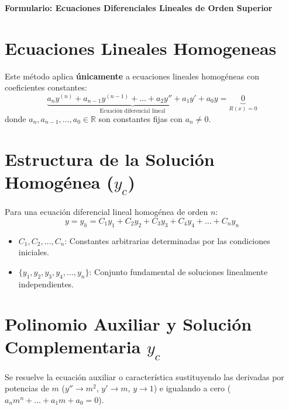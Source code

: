 \documentclass[10pt,letterpaper]{article}
\begin{document}
		
	\begin{center}
		{\Large \textbf{Formulario: Ecuaciones Diferenciales Lineales de Orden Superior}}
	\end{center}
	
	\vspace{0.3cm}
	
	\section*{Ecuaciones Lineales Homogeneas}
	Este método aplica \textbf{únicamente} a ecuaciones lineales homogéneas con coeficientes constantes:
	\[
	\underbrace{a_n y^{(n)} + a_{n-1} y^{(n-1)} + \dots + a_2 y'' + a_1 y' + a_0 y}_{\text{Ecuación diferencial lineal}} = \underbrace{0}_{R(x) = 0}
	\]
	donde $a_n, a_{n-1}, \dots, a_0 \in \mathbb{R}$ son constantes fijas con $a_n \neq 0$.
	
	
	
	\section*{Estructura de la Solución Homogénea ($y_c$)}
	Para una ecuación diferencial lineal homogénea de orden $n$:
	\[
	y = y_h = C_1 y_1 + C_2 y_2 + C_3 y_3 + C_4 y_4 + \dots + C_n y_n
	\]
	\begin{itemize}
		\item $C_1, C_2, \dots, C_n$: Constantes arbitrarias determinadas por las condiciones iniciales.
		\item $\{y_1, y_2, y_3, y_4, \dots, y_n\}$: Conjunto fundamental de soluciones linealmente independientes.
	\end{itemize}
	
	\hrulefill
	
	\section*{Polinomio Auxiliar y Solución Complementaria $y_c$}
	
	Se resuelve la ecuación auxiliar o característica sustituyendo las derivadas por potencias de $m$ ($y'' \to m^2$, $y' \to m$, $y \to 1$) e igualando a cero ($a_n m^n + \dots + a_1 m + a_0 = 0$).
	
\end{document}
